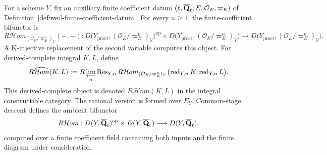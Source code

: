 \begin{definition}
\label{def:derived-internal-hom}


For a scheme \(Y\), fix an auxiliary finite coefficient datum
\((\ell,\overline{\mathbf Q}_\ell;E,\mathcal O_E,\varpi_E)\) of
Definition~\ref{def:weil-finite-coefficient-datum}.
For every \(n\geq1\), the finite-coefficient bifunctor is
\[
 R\mathcal Hom_{(\mathcal O_E/\varpi_E^n)_Y}(-,-):
 D\bigl(Y_{\mathrm{proet}},(\mathcal O_E/\varpi_E^n)_Y\bigr)^{\mathrm{op}}
 \times D\bigl(Y_{\mathrm{proet}},(\mathcal O_E/\varpi_E^n)_Y\bigr)
 \longrightarrow
 D\bigl(Y_{\mathrm{proet}},(\mathcal O_E/\varpi_E^n)_Y\bigr).
\]
A K-injective replacement of the second variable computes this object.  For
derived-complete integral \(K,L\), define
\[
 R\widehat{\mathcal Hom}(K,L):=
 R\varprojlim_n\operatorname{Res}_{Y,n}
 R\mathcal Hom_{(\mathcal O_E/\varpi_E^n)_Y}
 \bigl(\operatorname{red}_{Y,n}K,\operatorname{red}_{Y,n}L\bigr).
\]
This derived-complete object is denoted \(R\mathcal Hom(K,L)\) in the
integral constructible category.  The rational version is formed over
\(E_Y\).  Common-stage descent defines the ambient bifunctor
\[
 R\mathcal Hom:D(Y,\overline{\mathbf Q}_\ell)^{\mathrm{op}}\times D(Y,\overline{\mathbf Q}_\ell)
 \longrightarrow D(Y,\overline{\mathbf Q}_\ell),
\]
computed over a finite coefficient field containing both inputs and the
finite diagram under consideration.
\end{definition}



